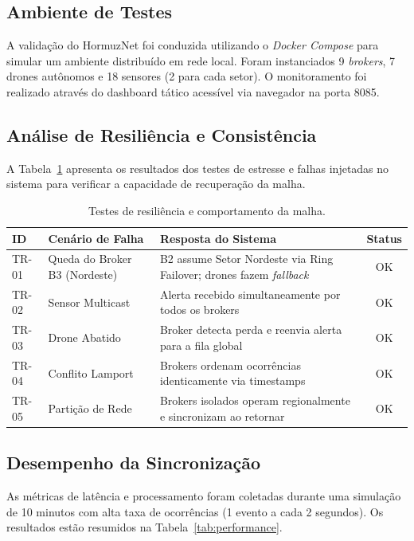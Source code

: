 \subsection{Ambiente de Testes}

A validação do HormuzNet foi conduzida utilizando o \textit{Docker Compose} para simular um ambiente distribuído em rede local. Foram instanciados 9 \textit{brokers}, 7 drones autônomos e 18 sensores (2 para cada setor). O monitoramento foi realizado através do dashboard tático acessível via navegador na porta 8085.

\subsection{Análise de Resiliência e Consistência}

A Tabela~\ref{tab:resiliencia} apresenta os resultados dos testes de estresse e falhas injetadas no sistema para verificar a capacidade de recuperação da malha.

\begin{table}[ht]
  \centering
  \caption{Testes de resiliência e comportamento da malha.}
  \label{tab:resiliencia}
  \begin{tabular}{p{1.5cm}p{4.5cm}p{5.5cm}c}
    \toprule
    \textbf{ID} & \textbf{Cenário de Falha} & \textbf{Resposta do Sistema} & \textbf{Status} \\
    \midrule
    TR-01 & Queda do Broker B3 (Nordeste) & B2 assume Setor Nordeste via Ring Failover; drones fazem \textit{fallback} & OK \\
    TR-02 & Sensor Multicast & Alerta recebido simultaneamente por todos os brokers & OK \\
    TR-03 & Drone Abatido & Broker detecta perda e reenvia alerta para a fila global & OK \\
    TR-04 & Conflito Lamport & Brokers ordenam ocorrências identicamente via timestamps & OK \\
    TR-05 & Partição de Rede & Brokers isolados operam regionalmente e sincronizam ao retornar & OK \\
    \bottomrule
  \end{tabular}
\end{table}

\subsection{Desempenho da Sincronização}

As métricas de latência e processamento foram coletadas durante uma simulação de 10 minutos com alta taxa de ocorrências (1 evento a cada 2 segundos). Os resultados estão resumidos na Tabela~\ref{tab:performance}.

